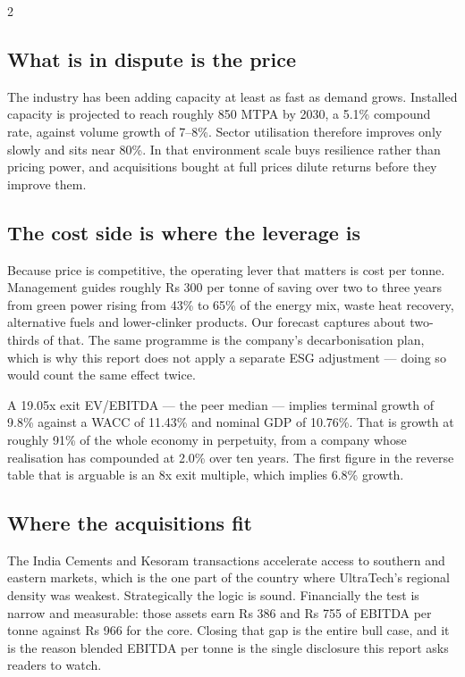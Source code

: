\begin{paracol}{2}
\subsection{What is in dispute is the price}

The industry has been adding capacity at least as fast as demand grows. Installed
capacity is projected to reach roughly 850 MTPA by 2030, a 5.1\% compound rate, against
volume growth of 7--8\%. Sector utilisation therefore improves only slowly and sits
near 80\%. In that environment scale buys resilience rather than pricing power, and
acquisitions bought at full prices dilute returns before they improve them.

\subsection{The cost side is where the leverage is}

Because price is competitive, the operating lever that matters is cost per tonne.
Management guides roughly Rs 300 per tonne of saving over two to three years from green
power rising from 43\% to 65\% of the energy mix, waste heat recovery, alternative
fuels and lower-clinker products. Our forecast captures about two-thirds of that. The
same programme is the company's decarbonisation plan, which is why this report does not
apply a separate ESG adjustment — doing so would count the same effect twice.

\begin{keybox}
A 19.05x exit EV/EBITDA — the peer median — implies terminal growth of 9.8\% against a
WACC of 11.43\% and nominal GDP of 10.76\%. That is growth at roughly 91\% of the whole
economy in perpetuity, from a company whose realisation has compounded at 2.0\% over
ten years. The first figure in the reverse table that is arguable is an 8x exit
multiple, which implies 6.8\% growth.
\end{keybox}

\subsection{Where the acquisitions fit}

The India Cements and Kesoram transactions accelerate access to southern and eastern
markets, which is the one part of the country where UltraTech's regional density was
weakest. Strategically the logic is sound. Financially the test is narrow and
measurable: those assets earn Rs 386 and Rs 755 of EBITDA per tonne against Rs 966 for
the core. Closing that gap is the entire bull case, and it is the reason blended EBITDA
per tonne is the single disclosure this report asks readers to watch.


\end{paracol}
